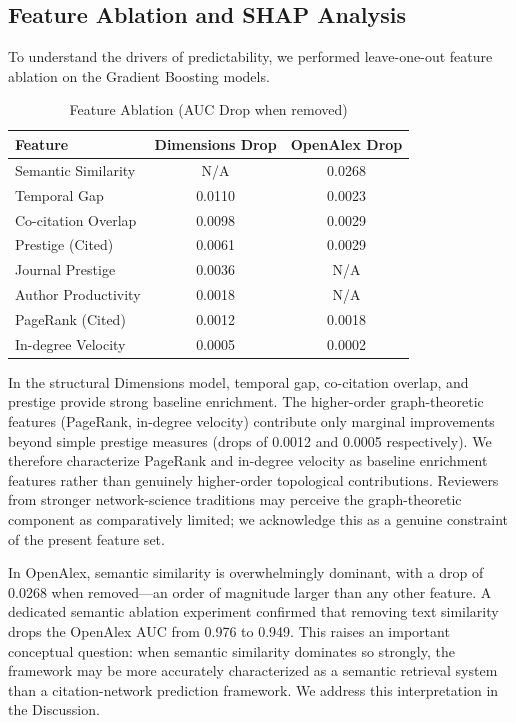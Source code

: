 \documentclass[11pt,a4paper]{article}
\begin{document}
\subsection{Feature Ablation and SHAP Analysis}
\label{sec:ablation}
To understand the drivers of predictability, we performed leave-one-out feature ablation on the Gradient Boosting models.

\begin{table}[H]
\centering
\caption{Feature Ablation (AUC Drop when removed)}
\label{tab:ablation}
\begin{tabular}{lcc}
\toprule
\textbf{Feature} & \textbf{Dimensions Drop} & \textbf{OpenAlex Drop} \\
\midrule
Semantic Similarity & N/A & 0.0268 \\
Temporal Gap & 0.0110 & 0.0023 \\
Co-citation Overlap & 0.0098 & 0.0029 \\
Prestige (Cited) & 0.0061 & 0.0029 \\
Journal Prestige & 0.0036 & N/A \\
Author Productivity & 0.0018 & N/A \\
PageRank (Cited) & 0.0012 & 0.0018 \\
In-degree Velocity & 0.0005 & 0.0002 \\
\bottomrule
\end{tabular}
\end{table}

In the structural Dimensions model, temporal gap, co-citation overlap, and prestige provide strong baseline enrichment. The higher-order graph-theoretic features (PageRank, in-degree velocity) contribute only marginal improvements beyond simple prestige measures (drops of 0.0012 and 0.0005 respectively). We therefore characterize PageRank and in-degree velocity as baseline enrichment features rather than genuinely higher-order topological contributions. Reviewers from stronger network-science traditions may perceive the graph-theoretic component as comparatively limited; we acknowledge this as a genuine constraint of the present feature set.

In OpenAlex, semantic similarity is overwhelmingly dominant, with a drop of 0.0268 when removed---an order of magnitude larger than any other feature. A dedicated semantic ablation experiment confirmed that removing text similarity drops the OpenAlex AUC from 0.976 to 0.949. This raises an important conceptual question: when semantic similarity dominates so strongly, the framework may be more accurately characterized as a semantic retrieval system than a citation-network prediction framework. We address this interpretation in the Discussion.
\end{document}
